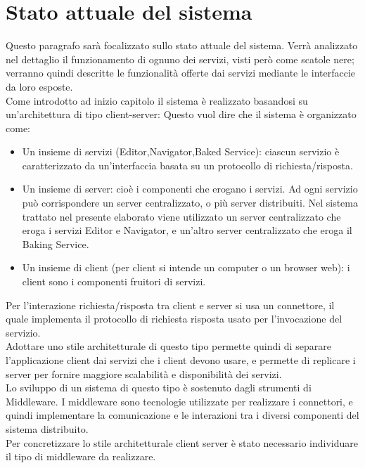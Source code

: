 \newpage
\section{Stato attuale del sistema}
\label{sec:chapter_architettura_sistema_il_servizio}

Questo paragrafo sarà focalizzato sullo stato attuale del sistema. Verrà analizzato nel dettaglio il funzionamento di ognuno dei servizi, visti però come scatole nere; verranno quindi descritte le funzionalità offerte dai servizi mediante le interfaccie da loro esposte.
\\
Come introdotto ad inizio capitolo il sistema è realizzato basandosi su un’architettura di tipo client-server: Questo vuol dire che il sistema è organizzato come:
\begin{itemize}
\item Un insieme di servizi (Editor,Navigator,Baked Service): ciascun servizio è caratterizzato da un’interfaccia basata su un protocollo di richiesta/risposta.
\item Un insieme di server: cioè i componenti che erogano i servizi. Ad ogni servizio può corrispondere un server centralizzato, o più server distribuiti. Nel sistema trattato nel presente elaborato viene utilizzato un server centralizzato che eroga i servizi Editor e Navigator, e un’altro server centralizzato che eroga il Baking Service.
\item Un insieme di client (per client si intende un computer o un browser web): i client sono i componenti fruitori di servizi.
\end{itemize}
Per l’interazione richiesta/risposta tra client e server si usa un connettore, il quale implementa il protocollo di richiesta risposta usato per l’invocazione del servizio.
\\
Adottare uno stile architetturale di questo tipo permette quindi di separare l’applicazione client dai servizi che i client devono usare, e permette di replicare i server per fornire maggiore scalabilità e disponibilità dei servizi. 
\\
Lo sviluppo di un sistema di questo tipo è sostenuto dagli strumenti di Middleware. I middleware sono tecnologie utilizzate per realizzare i connettori, e quindi implementare la comunicazione e le interazioni tra i diversi componenti del sistema distribuito.
\\  
Per concretizzare lo stile architetturale client server è stato necessario individuare il tipo di middleware da realizzare. 
\\
